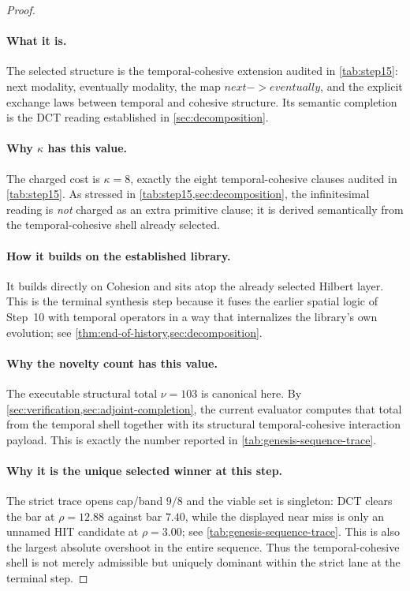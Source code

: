 \documentclass[11pt,a4paper]{article}
\def\to{->}%
\def\bigcirc{next}%
\def\Diamond{eventually}%
\theoremstyle{plain}
\theoremstyle{definition}
\theoremstyle{remark}
\begin{document}
\begin{proof}
\paragraph{What it is.}
The selected structure is the temporal-cohesive extension audited in
\cref{tab:step15}: next modality, eventually modality, the map
$\bigcirc\to\Diamond$, and the explicit exchange laws between temporal and
cohesive structure.
Its semantic completion is the DCT reading established in
\cref{sec:decomposition}.

\paragraph{Why $\kappa$ has this value.}
The charged cost is $\kappa=8$, exactly the eight temporal-cohesive clauses
audited in \cref{tab:step15}.
As stressed in \cref{tab:step15,sec:decomposition}, the infinitesimal reading is
\emph{not} charged as an extra primitive clause; it is derived semantically from
the temporal-cohesive shell already selected.

\paragraph{How it builds on the established library.}
It builds directly on Cohesion and sits atop the already selected Hilbert layer.
This is the terminal synthesis step because it fuses the earlier spatial logic
of Step~10 with temporal operators in a way that internalizes the library's own
evolution; see \cref{thm:end-of-history,sec:decomposition}.

\paragraph{Why the novelty count has this value.}
The executable structural total $\nu=103$ is canonical here.
By \cref{sec:verification,sec:adjoint-completion}, the current evaluator
computes that total from the temporal shell together with its structural
temporal-cohesive interaction payload.
This is exactly the number reported in \cref{tab:genesis-sequence-trace}.

\paragraph{Why it is the unique selected winner at this step.}
The strict trace opens cap/band $9/8$ and the viable set is singleton:
DCT clears the bar at $\rho=12.88$ against bar $7.40$, while the displayed near
miss is only an unnamed HIT candidate at $\rho=3.00$; see
\cref{tab:genesis-sequence-trace}.
This is also the largest absolute overshoot in the entire sequence.
Thus the temporal-cohesive shell is not merely admissible but uniquely dominant
within the strict lane at the terminal step.
\end{proof}
\end{document}
